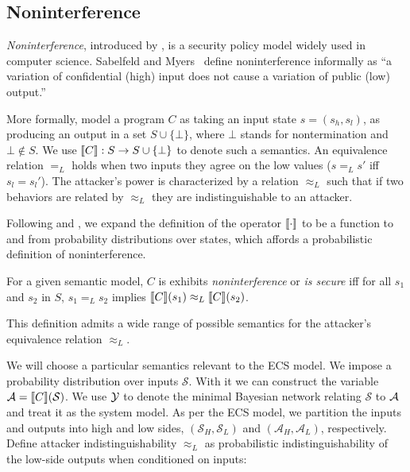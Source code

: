 \documentclass[../thesis.tex]{subfiles}
\begin{document}
\subsection{Noninterference}
\label{sec:noninterference}

\emph{Noninterference}, introduced by \cite{gm82security},
is a security policy model widely used in computer science.
Sabelfeld and Myers~\cite{sabelfeld03journal} define noninterference
informally as ``a variation of confidential (high)
input does not cause a variation of public (low) output.''

More formally, model a program $C$ as taking an
input state $s = (s_h,s_l)$,
as producing an output in a set $S \cup \{ \bot \}$,
where
$\bot$ stands for nontermination
and $\bot \notin S$.
We use $\llbracket C\rrbracket  : S \rightarrow S \cup \{ \bot \}$
to denote such a semantics.
An equivalence relation $=_L$ holds when
two inputs they agree on the low values ($s=_Ls'$ iff
$s_l = s_l'$). The attacker's power is characterized
by a relation $\approx_L$ such that if two behaviors
are related by $\approx_L$ they are indistinguishable
to an attacker. 

Following \cite{tschantz15csf} and \cite{datta2017use},
we expand the definition of the operator $\llbracket \cdot\rrbracket $
to be a function to and from probability distributions
over states, which affords a probabilistic definition
of noninterference.

\begin{dfn}
For a given semantic model, $C$ is
  exhibits \emph{noninterference} or \emph{is secure} iff for all $s_1$ and $s_2$ in $S$, $s_1 =_L s_2$ implies $\llbracket C\rrbracket(s_1) \approx_L \llbracket C\rrbracket(s_2)$.
\end{dfn}

This definition admits a wide range of possible semantics for
the attacker's equivalence relation $\approx_L$.

We will choose a particular semantics relevant
to the ECS model.
We impose a probability distribution over inputs
$\mathcal{S}$.
With it we can construct the variable 
$\mathcal{A} = \llbracket C\rrbracket(\mathcal{S})$.
We use $\mathcal{Y}$ to denote the minimal Bayesian network relating
$\mathcal{S}$ to $\mathcal{A}$ and treat it as the system model.
As per the ECS model, we partition the inputs
and outputs into high and low sides,
$(\mathcal{S}_H, \mathcal{S}_L)$ and
$(\mathcal{A}_H, \mathcal{A}_L)$,
respectively.
Define attacker indistinguishability $\approx_L$
as probabilistic indistinguishability of the low-side outputs when
conditioned on inputs:
\end{document}
